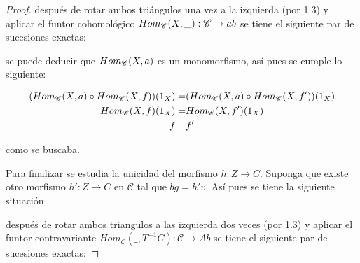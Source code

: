 \documentclass{article}
\begin{document}
\begin{enumerate}[label=\textbf{Ej \arabic*.}]
\begin{proof}
			después de rotar ambos triángulos una vez a la izquierda (por 1.3) y aplicar el funtor cohomol\'ogico $Hom_{\mathscr{C}}(X,\_):\mathscr{C} \to ab$ se tiene el siguiente par de sucesiones exactas:
			
			\begin{center}
			\end{center}
			se puede deducir que $Hom_{\mathscr{C}}(X,a)$ es un monomorfismo, así pues se cumple lo siguiente:
			
			\begin{align*}
				(Hom_{\mathscr{C}}(X,a)\circ Hom_{\mathscr{C}}(X,f))(1_{X}) =& (Hom_{\mathscr{C}}(X,a)\circ Hom_{\mathscr{C}}(X,f'))(1_{X})\\
				Hom_{\mathscr{C}}(X,f)(1_{X}) =& Hom_{\mathscr{C}}(X,f')(1_{X})\\
				f =& f'
			\end{align*}
			
			como se buscaba.
			
			\bigskip
			
			Para finalizar se estudia la unicidad del morfismo $h:Z\to C$. Suponga que existe otro morfismo $h':Z\to C$ en $\mathcal{C}$ tal que $bg=h'v$. As\'i pues se tiene la siguiente situaci\'on
			
			\begin{center}
			\end{center}
			
			despu\'es de rotar ambos triangulos a las izquierda dos veces (por 1.3) y aplicar el funtor contravariante $Hom_{\mathcal{C}}(\_,T^{-1}C):\mathcal{C} \to Ab$ se tiene el siguiente par de sucesiones exactas:
			

\end{proof}
\end{enumerate}
\end{document}
